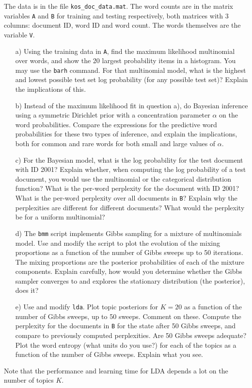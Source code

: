 \documentclass[11pt]{article}
\begin{document}
The data is in the file \texttt{kos\_doc\_data.mat}. The word counts
are in the matrix variables \texttt{A} and \texttt{B} for training and
testing respectively, both matrices with 3 columns: document ID, word
ID and word count. The words themselves are the variable \texttt{V}. 
%
\begin{enumerate}

\item[a)] Using the training data in \texttt{A}, find the maximum
  likelihood multinomial over words, and show the 20 largest
  probability items in a histogram. You may use the \texttt{barh}
  command. For that multinomial model, what is the highest and lowest
  possible test set log probability (for any possible test set)?
  Explain the implications of this.

\item[b)] Instead of the maximum likelihood fit in question a), do
  Bayesian inference using a symmetric Dirichlet prior with a
  concentration parameter $\alpha$ on the word probabilities.  Compare
  the expressions for the predictive word probabilities for these two
  types of inference, and explain the implications, both for common
  and rare words for both small and large values of $\alpha$.

\item[c)] For the Bayesian model, what is the log probability for the
  test document with ID 2001? Explain whether, when computing the log
  probability of a test document, you would use the multinomial or the
  categorical distribution function? What is the per-word perplexity
  for the document with ID 2001? What is the per-word perplexity over
  all documents in \texttt{B}? Explain why the perplexities are
  different for different documents? What would the perplexity be for
  a uniform multinomial?

\item[d)] The \texttt{bmm} script implements Gibbs sampling for a
  mixture of multinomials model. Use and modify the script to plot the
  evolution of the mixing proportions as a function of the number of
  Gibbs sweeps up to 50 iterations. The mixing proportions are the
  posterior probabilities of each of the mixture components. Explain
  carefully, how would you determine whether the Gibbs sampler
  converges to and explores the stationary distribution (the
  posterior), does it?
 
\item[e)] Use and modify \texttt{lda}. Plot topic posteriors for
  $K=20$ as a function of the number of Gibbs sweeps, up to 50
  sweeps. Comment on these. Compute the perplexity for the documents
  in \texttt{B} for the state after 50 Gibbs sweeps, and compare to
  previously computed perplexities. Are 50 Gibbs sweeps adequate?
  Plot the word entropy (what units do you use?) for each of the
  topics as a function of the number of Gibbs sweeps. Explain what you
  see.

\end{enumerate}

Note that the performance and learning time for LDA depends a lot on
the number of topics $K$.
\end{document}
